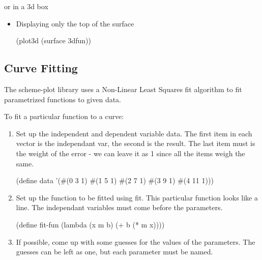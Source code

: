 \documentclass{article}
\begin{document}
{\begin{itemize}
\begin{itemize}
\end{itemize}
or in a 3d box\begin{itemize}
\item Displaying only the top of the surface
\begin{schemedisplay}
(plot3d (surface 3dfun))
\end{schemedisplay}

\end{itemize}



\end{itemize}

\label{Curve Fitting}
\subsection{Curve Fitting}



The scheme-plot library uses a Non-Linear Least Squares fit algorithm 
       to fit parametrized functions to given data.


To fit a particular function to a curve:
\begin{enumerate}
\item Set up the independent and dependent variable data. The first item in each vector is the 
independant var, the second is the result. The last item must is the weight of the error - we can leave 
it as 1 since all the items weigh the same.
\begin{schemedisplay}

(define data '(#(0 3 1)
               #(1 5 1)
               #(2 7 1)
               #(3 9 1)
               #(4 11 1)))

\end{schemedisplay}

\item Set up the function to be fitted using fit. This particular function
         looks like a line. The independant variables must come before the parameters.
\begin{schemedisplay}

(define fit-fun 
 (lambda (x m b) (+ b (* m x))))
\end{schemedisplay}

\item If possible, come up with some guesses for the values of the parameters.
        The guesses can be left as one, but each parameter must be named.



\end{enumerate}}
\end{document}

